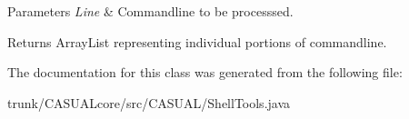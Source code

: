 \begin{DoxyParams}{Parameters}
{\em Line} & Commandline to be processsed. \\
\hline
\end{DoxyParams}
\begin{DoxyReturn}{Returns}
Array\-List representing individual portions of commandline. 
\end{DoxyReturn}


The documentation for this class was generated from the following file\-:\begin{DoxyCompactItemize}
\item 
trunk/\-C\-A\-S\-U\-A\-Lcore/src/\-C\-A\-S\-U\-A\-L/Shell\-Tools.\-java\end{DoxyCompactItemize}
